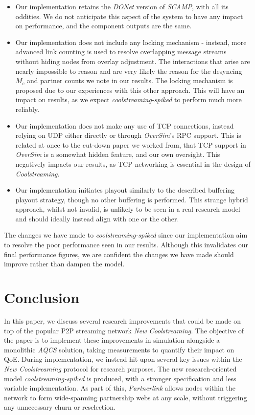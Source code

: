 \documentclass[12pt,a4paper]{article}
\begin{document}
\begin{itemize}
	\item Our implementation retains the \textit{DONet} version of \textit{SCAMP}, with all its oddities. We do not anticipate this aspect of the system to have any impact on performance, and the component outputs are the same.
	\item Our implementation does not include any locking mechanism - instead, more advanced link counting is used to resolve overlapping message streams without hiding nodes from overlay adjustment. The interactions that arise are nearly impossible to reason and are very likely the reason for the desyncing \(M_c\) and partner counts we note in our results. The locking mechanism is proposed due to our experiences with this other approach. This will have an impact on results, as we expect \textit{coolstreaming-spiked} to perform much more reliably.
	\item Our implementation does not make any use of TCP connections, instead relying on UDP either directly or through \textit{OverSim}'s RPC support. This is related at once to the cut-down paper we worked from, that TCP support in \textit{OverSim} is a somewhat hidden feature, and our own oversight. This negatively impacts our results, as TCP networking is essential in the design of \textit{Coolstreaming}.
	\item Our implementation initiates playout similarly to the described buffering playout strategy, though no other buffering is performed. This strange hybrid approach, whilst not invalid, is unlikely to be seen in a real research model and should ideally instead align with one or the other.
\end{itemize}

The changes we have made to \textit{coolstreaming-spiked} since our implementation aim to resolve the poor performance seen in our results. Although this invalidates our final performance figures, we are confident the changes we have made should improve rather than dampen the model.

\section{Conclusion} \label{conclusion}
In this paper, we discuss several research improvements that could be made on top of the popular P2P streaming network \textit{New Coolstreaming}. The objective of the paper is to implement these improvements in simulation alongside a monolithic \textit{AQCS} solution, taking measurements to quantify their impact on QoE. During implementation, we instead hit upon several key issues within the \textit{New Coolstreaming} protocol for research purposes. The new research-oriented model \textit{coolstreaming-spiked} is produced, with a stronger specification and less variable implementation. As part of this, \textit{Partnerlink} allows nodes within the network to form wide-spanning partnership webs at any scale, without triggering any unnecessary churn or reselection.
\end{document}
